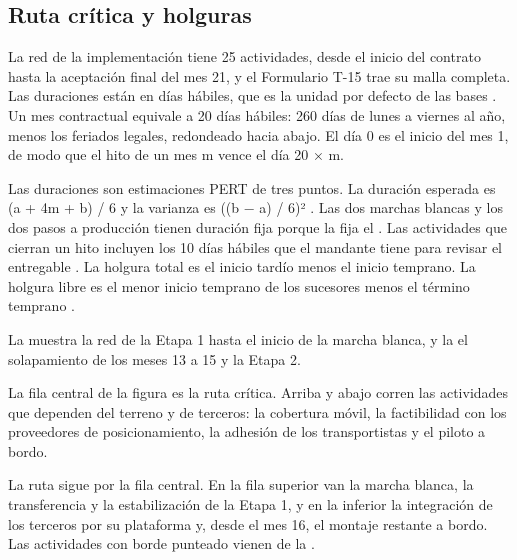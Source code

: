 \subsection{Ruta crítica y holguras}\label{sec:7-ruta}

La red de la implementación tiene 25 actividades, desde el inicio del contrato hasta la aceptación
final del mes 21, y el Formulario T-15 trae su malla completa. Las duraciones están en días hábiles,
que es la unidad por defecto de las bases . Un mes contractual equivale a 20 días
hábiles: 260 días de lunes a viernes al año, menos los feriados legales, redondeado hacia abajo. El
día 0 es el inicio del mes 1, de modo que el hito de un mes m vence el día 20 × m.

Las duraciones son estimaciones PERT de tres puntos. La duración esperada es (a + 4m + b) / 6 y la
varianza es ((b − a) / 6)² \parencite{malcolm1959}. Las dos marchas blancas y los dos pasos a
producción tienen duración fija porque la fija el . Las actividades que cierran un hito
incluyen los 10 días hábiles que el mandante tiene para revisar el entregable . La
holgura total es el inicio tardío menos el inicio temprano. La holgura libre es el menor inicio
temprano de los sucesores menos el término temprano \parencite{pmi2019}.

La  muestra la red de la Etapa 1 hasta el inicio de la marcha blanca, y la
 el solapamiento de los meses 13 a 15 y la Etapa 2.


La fila central de la figura es la ruta crítica. Arriba y abajo corren las actividades que dependen
del terreno y de terceros: la cobertura móvil, la factibilidad con los proveedores de posicionamiento,
la adhesión de los transportistas y el piloto a bordo.


La ruta sigue por la fila central. En la fila superior van la marcha blanca, la transferencia y la
estabilización de la Etapa 1, y en la inferior la integración de los terceros por su plataforma y, desde el mes 16, el montaje restante a bordo. Las actividades con
borde punteado vienen de la .

